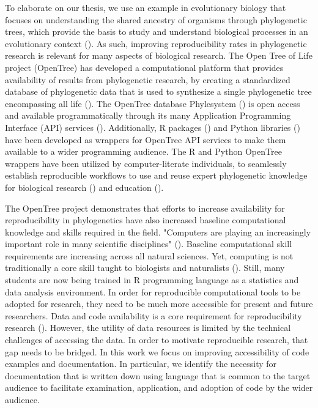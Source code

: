\documentclass[12pt]{article}
\begin{document}
To elaborate on our thesis, we use an example in evolutionary biology that focuses
on understanding the shared ancestry of organisms through phylogenetic trees, which provide the
basis to study and understand biological processes in an evolutionary context (\cite{dobzhansky1973nothing}).
As such, improving reproducibility rates
in phylogenetic research is relevant for many aspects of biological research.
The Open Tree of Life project (OpenTree) has developed a computational platform that provides
availability of results from phylogenetic research, by creating a standardized database of
phylogenetic data that is used to synthesize a single phylogenetic tree encompassing
all life (\cite{opentreeoflife2019synth}).
The OpenTree database Phylesystem (\cite{}) is open access and available programmatically through its many
Application Programming Interface (API) services (\cite{opentreeAPIs}).
Additionally, R packages (\cite{michonneau2016rotl}) and Python libraries
(\cite{mctavish2021opentree}) have been developed as wrappers for OpenTree API services
to make them available to a wider programming audience.
The R and Python OpenTree wrappers have been utilized by computer-literate individuals,
to seamlessly establish reproducible workflows to use and reuse expert phylogenetic
knowledge for biological research (\cite{sanchez2019datelife}) and education
(\cite{nguyen2020phylotastic, phylotasticedtools, galacticedtools}).

The OpenTree project demonstrates that efforts to increase availability for reproducibility
in phylogenetics have also increased baseline computational knowledge and skills
required in the field.
"Computers are playing an increasingly important role in many scientific disciplines" (\cite{piccolo2016tools}).
Baseline computational skill requirements are increasing across all natural sciences.
Yet, computing is not traditionally a core skill taught to biologists and naturalists
(\cite{sayres2018bioinformatics, wright2019the, williams2019barriers}).
Still, many students are now being trained in R programming language as a statistics and data analysis environment.
In order for reproducible computational tools to be adopted for research, they
 need to be much more accessible for present and future researchers.
Data and code availability is a core requirement for reproducibility research
 (\cite{peng2011reproducible, sandve2013ten, powers2019open}).
However, the utility of data resources is limited by the technical challenges of accessing the data.
In order to motivate reproducible research, that gap needs to be bridged.
In this work we focus on improving accessibility of code examples and documentation.
In particular, we identify the necessity for documentation that is written down
 using language that is common to the target audience to facilitate examination,
  application, and adoption of code by the wider audience.
\end{document}
